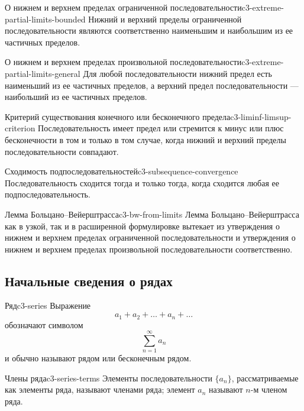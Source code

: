 \begin{proposition}{О нижнем и верхнем пределах ограниченной последовательности}{c3-extreme-partial-limits-bounded}
  Нижний и верхний пределы ограниченной последовательности являются
  соответственно наименьшим и наибольшим из ее частичных пределов.
\end{proposition}

\begin{proposition}{О нижнем и верхнем пределах произвольной последовательности}{c3-extreme-partial-limits-general}
  Для любой последовательности нижний предел есть наименьший из ее
  частичных пределов, а верхний предел последовательности — наибольший из
  ее частичных пределов.
\end{proposition}

\begin{corollary}{Критерий существования конечного или бесконечного предела}{c3-liminf-limsup-criterion}
  Последовательность имеет предел или стремится к минус или плюс
  бесконечности в том и только в том случае, когда нижний и верхний пределы
  последовательности совпадают.
\end{corollary}

\begin{corollary}{Сходимость подпоследовательностей}{c3-subsequence-convergence}
  Последовательность сходится тогда и только тогда, когда сходится любая ее
  подпоследовательность.
\end{corollary}

\begin{corollary}{Лемма Больцано--Вейерштрасса}{c3-bw-from-limits}
  Лемма Больцано--Вейерштрасса как в узкой, так и в расширенной
  формулировке вытекает из утверждения о нижнем и верхнем пределах
  ограниченной последовательности и утверждения о нижнем и верхнем
  пределах произвольной последовательности соответственно.
\end{corollary}

\subsection{Начальные сведения о рядах}

\begin{definition}{Ряд}{c3-series}
  Выражение
  \[
    a_1+a_2+\ldots+a_n+\ldots
  \]
  обозначают символом
  \[
    \sum_{n=1}^{\infty}a_n
  \]
  и обычно называют рядом или бесконечным рядом.
\end{definition}

\begin{definition}{Члены ряда}{c3-series-terms}
  Элементы последовательности $\{a_n\}$, рассматриваемые как элементы ряда,
  называют членами ряда; элемент $a_n$ называют $n$-м членом ряда.
\end{definition}

